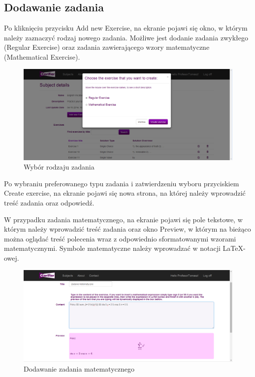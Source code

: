 \documentclass{pracamgr}
\begin{document}
\newpage
\subsection{Dodawanie zadania}
Po kliknięciu przycisku Add new Exercise, na ekranie pojawi się okno, w którym należy zaznaczyć rodzaj nowego zadania. Możliwe jest dodanie zadania zwykłego (Regular Exercise) oraz zadania zawierającego wzory matematyczne (Mathematical Exercise). 

\begin{figure}[h]
    \centering
    \includegraphics[width=1.0\textwidth]{Web_course_new_exercise.png}
    \caption{Wybór rodzaju zadania}
    \label{fig:web_course_new_exercise}
\end{figure}

Po wybraniu preferowanego typu zadania i zatwierdzeniu wyboru przyciskiem Create exercise, na ekranie pojawi się nowa strona, na której należy wprowadzić treść zadania oraz odpowiedź. 

W przypadku zadania matematycznego, na ekranie pojawi się pole tekstowe, w którym należy wprowadzić treść zadania oraz okno Preview, w którym na bieżąco można oglądać treść polecenia wraz z odpowiednio sformatowanymi wzorami matematycznymi. Symbole matematyczne należy wprowadzać w notacji LaTeX-owej.

\begin{figure}[h]
    \centering
    \includegraphics[width=1.0\textwidth]{Web_math_exercise.png}
    \caption{Dodawanie zadania matematycznego}
    \label{fig:web_math_exercise}
\end{figure}
\end{document}
